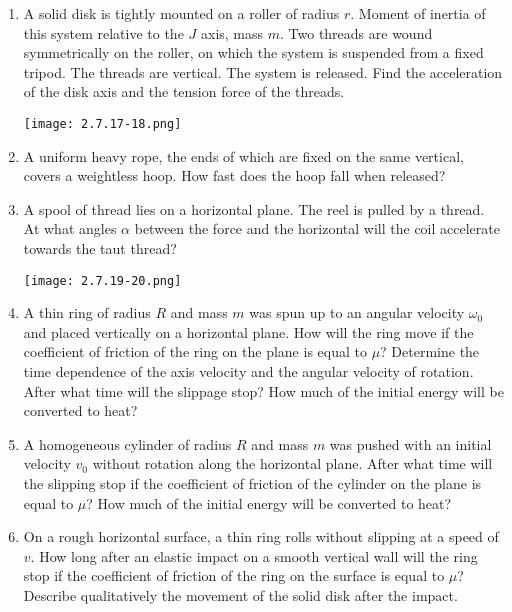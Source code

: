 \documentclass{article}
\begin{document}
\begin{enumerate}[label=2.7.\arabic*]
\item A solid disk is tightly mounted on a roller of radius $r$. Moment of inertia of this system relative to the $J$ axis, mass $m$. Two threads are wound symmetrically on the roller, on which the system is suspended from a fixed tripod. The threads are vertical. The system is released. Find the acceleration of the disk axis and the tension force of the threads.

\begin{center}
    \texttt{[image: 2.7.17-18.png]}
\end{center}

\item A uniform heavy rope, the ends of which are fixed on the same vertical, covers a weightless hoop. How fast does the hoop fall when released?

\item A spool of thread lies on a horizontal plane. The reel is pulled by a thread. At what angles $\alpha$ between the force and the horizontal will the coil accelerate towards the taut thread?

\begin{center}
    \texttt{[image: 2.7.19-20.png]}
\end{center}

\item A thin ring of radius $R$ and mass $m$ was spun up to an angular velocity $\omega_0$ and placed vertically on a horizontal plane. How will the ring move if the coefficient of friction of the ring on the plane is equal to $\mu$? Determine the time dependence of the axis velocity and the angular velocity of rotation. After what time will the slippage stop? How much of the initial energy will be converted to heat?

\item A homogeneous cylinder of radius $R$ and mass $m$ was pushed with an initial velocity $v_0$ without rotation along the horizontal plane. After what time will the slipping stop if the coefficient of friction of the cylinder on the plane is equal to $\mu$? How much of the initial energy will be converted to heat?

\item On a rough horizontal surface, a thin ring rolls without slipping at a speed of $v$. How long after an elastic impact on a smooth vertical wall will the ring stop if the coefficient of friction of the ring on the surface is equal to $\mu$? Describe qualitatively the movement of the solid disk after the impact.


\end{enumerate}
\end{document}
